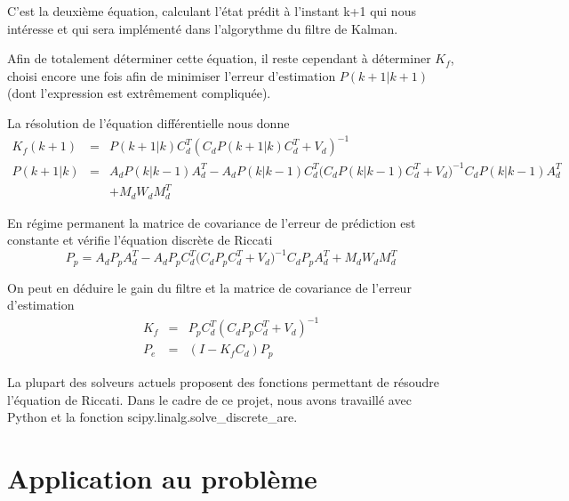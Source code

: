 \documentclass[12pt,twoside,a4paper]{article}
\begin{document}
\noindent C'est la deuxième équation, calculant l'état prédit à l'instant k+1 qui nous intéresse et qui sera implémenté dans l'algorythme du filtre de Kalman. \\

\vspace{1cm}

Afin de totalement déterminer cette équation, il reste cependant à déterminer $K_{f}$, choisi encore une fois afin de minimiser l'erreur d'estimation $P(k+1|k+1)$ (dont l'expression est extrêmement compliquée).

La résolution de l'équation différentielle nous donne
$$
\begin{array}{lll}
K_{f}(k+1) &=& P(k+1|k)C_{d}^{T}(C_{d}P(k+1|k)C_{d}^{T}+V_{d})^{-1} \\
P(k+1|k) &=&  A_{d}P(k|k-1)A_{d}^{T} -A_{d}P(k|k-1)C_{d}^{T}\big(C_{d}P(k|k-1)C_{d}^{T}+V_{d}\big)^{-1}C_{d}P(k|k-1)A_{d}^{T} \\
&& + M_{d}W_{d}M_{d}^{T}
\end{array}
$$

En régime permanent la matrice de covariance de l'erreur de prédiction est constante et vérifie l'équation discrète de Riccati
$$ P_{p} =  A_{d}P_{p}A_{d}^{T} -A_{d}P_{p}C_{d}^{T}\big(C_{d}P_{p}C_{d}^{T}+V_{d}\big)^{-1}C_{d}P_{p}A_{d}^{T}  + M_{d}W_{d}M_{d}^{T} $$

\vspace{1cm}
On peut en déduire le gain du filtre et la matrice de covariance de l'erreur d'estimation
$$
\begin{array}{lll}
K_{f} &=& P_{p}C_{d}^{T}(C_{d}P_{p}C_{d}^{T}+V_{d})^{-1} \\
P_{e} &=& (I-K_{f}C_{d})P_{p}
\end{array}$$



La plupart des solveurs actuels proposent des fonctions permettant de résoudre l'équation de Riccati.
Dans le cadre de ce projet, nous avons travaillé avec Python et la fonction scipy.linalg.solve\_discrete\_are. \\

\section{Application au problème}
\end{document}
